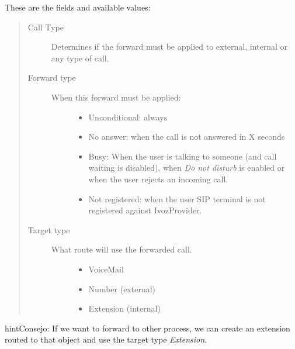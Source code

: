 \documentclass[letterpaper,10pt,spanish]{sphinxmanual}
\begin{document}
These are the fields and available values:
\begin{quote}
\begin{description}
\item[{Call Type}] \leavevmode
Determines if the forward must be applied to external, internal or any
type of call.

\item[{Forward type}] \leavevmode\begin{description}
\item[{When this forward must be applied:}] \leavevmode\begin{itemize}
\item {} 
Unconditional: always

\item {} 
No answer: when the call is not answered in X seconds

\item {} 
Busy: When the user is talking to someone (and call waiting is
disabled), when \emph{Do not disturb} is enabled or when the user
rejects an incoming call.

\item {} 
Not registered: when the user SIP terminal is not registered
against IvozProvider.

\end{itemize}

\end{description}

\item[{Target type}] \leavevmode\begin{description}
\item[{What route will use the forwarded call.}] \leavevmode\begin{itemize}
\item {} 
VoiceMail

\item {} 
Number (external)

\item {} 
Extension (internal)

\end{itemize}

\end{description}

\end{description}
\end{quote}

\begin{notice}{hint}{Consejo:}
If we want to forward to other process, we can create an extension
routed to that object and use the target type \emph{Extension}.
\end{notice}
\end{document}
